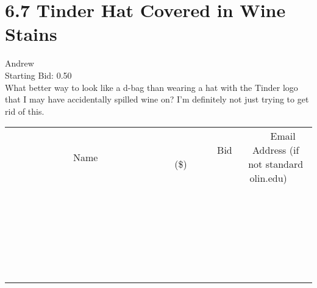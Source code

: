 \documentclass[11pt]{article}
\begin{document}
					\section*{6.7 Tinder Hat Covered in Wine Stains}
					Andrew \\
					Starting Bid: 0.50 \\
					What better way to look like a d-bag than wearing a hat with the Tinder logo that I may have accidentally spilled wine on? I'm definitely not just trying to get rid of this. \\
					[6ex]
					\begin{tabular}{c c c}
						~~~~~~~~~~~~~Name~~~~~~~~~~~~~ & ~~~~~~~~~Bid (\$)~~~~~~~~~ & ~~~Email Address (if not standard olin.edu)~~~ \\
				
 & & \\
\hline
 & & \\
\hline
 & & \\
\hline
 & & \\
\hline
 & & \\
\hline
 & & \\
\hline
 & & \\
\hline
 & & \\
\hline
 & & \\
\hline
 & & \\
\hline
 & & \\
\hline
 & & \\
\hline
 & & \\
\hline
 & & \\
\hline
 & & \\
\hline
 & & \\
\hline
 & & \\
\hline
 & & \\
\hline
 & & \\
\hline
 & & \\
\hline
 & & \\
\hline
 & & \\
\hline
 & & \\
\hline
 & & \\
\hline
 & & \\
\hline
 & & \\
\hline
					\end{tabular}
					\clearpage
				
\end{document}

